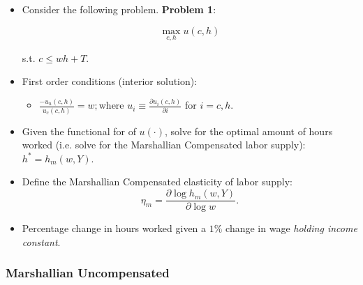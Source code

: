 \documentclass[11pt]{article}
\begin{document}
\begin{itemize}
\item Consider the following problem. \textbf{Problem 1}:

\begin{equation*}
\max_{c,h}u\left( c,h\right) 
\end{equation*}

s.t. $c\leq wh+T$.
\item First order conditions (interior solution):

\begin{itemize}
\item $\frac{-u_{h}\left( c,h\right) }{u_{c}\left( c,h\right) }=w;$where $
u_{i}\equiv \frac{\partial u_{i}\left( c,h\right) }{\partial i}$ for $i=c,h$.
\end{itemize}

\item Given the functional for of $u\left( \cdot \right) $, solve for the
optimal amount of hours worked (i.e. solve for the Marshallian Compensated labor supply): $h^{\ast }=h_{m}\left( w,Y\right)$.


\item Define the Marshallian Compensated elasticity of labor supply:
\begin{equation}
\eta _{m}=\frac{\partial \log h_{m}\left( w,Y\right) }{\partial \log w}.
\end{equation}

\item Percentage change in hours worked given a $1\%$ change in wage \textit{
holding income constant}.
\end{itemize}

\subsubsection*{Marshallian Uncompensated}
\end{document}
